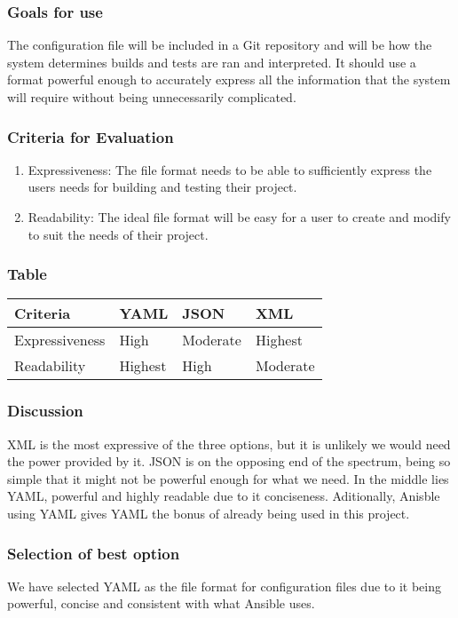 \documentclass[10pt,letterpaper,onecolumn,draftclsnofoot]{IEEEtran}
\begin{document}
\subsubsection{Goals for use}
The configuration file will be included in a Git repository and will be how the system determines builds and tests are ran and interpreted. It should use a format powerful enough to accurately express all the information that the system will require without being unnecessarily complicated.
\subsubsection{Criteria for Evaluation}
\begin{enumerate}
  \item Expressiveness: The file format needs to be able to sufficiently express the users needs for building and testing their project.
  \item Readability: The ideal file format will be easy for a user to create and modify to suit the needs of their project.
\end{enumerate}
\subsubsection{Table}
\begin{center}
  \begin{tabular}{llll}
    Criteria & YAML & JSON & XML \\ \midrule
    Expressiveness       & High & Moderate & Highest \\ \midrule
    Readability       & Highest & High & Moderate \\ \bottomrule
  \end{tabular}
\end{center}
\subsubsection{Discussion}
XML is the most expressive of the three options, but it is unlikely we would need the power provided by it. JSON is on the opposing end of the spectrum, being so simple that it might not be powerful enough for what we need. In the middle lies YAML, powerful and highly readable due to it conciseness. Aditionally, Anisble using YAML gives YAML the bonus of already being used in this project.
\subsubsection{Selection of best option}
We have selected YAML as the file format for configuration files due to it being powerful, concise and consistent with what Ansible uses.
\end{document}

